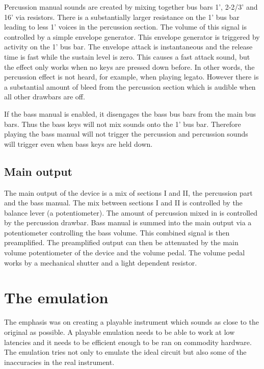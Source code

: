 \documentclass[11pt,a4paper]{article}
\begin{document}
Percussion manual sounds are created by mixing together bus bars 1', 2-2/3' and 16' via resistors. There is a substantially larger resistance on the 1' bus bar leading to less 1' voices in the percussion section. The volume of this signal is controlled by a simple envelope generator. This envelope generator is triggered by activity on the 1' bus bar. The envelope attack is instantaneous and the release time is fast while the sustain level is zero. This causes a fast attack sound, but the effect only works when no keys are pressed down before. In other words, the percussion effect is not heard, for example, when playing legato. However there is a substantial amount of bleed from the percussion section which is audible when all other drawbars are off.

If the bass manual is enabled, it disengages the bass bus bars from the main bus bars. Thus the bass keys will not mix sounds onto the 1' bus bar. Therefore playing the bass manual will not trigger the percussion and percussion sounds will trigger even when bass keys are held down.

\subsection{Main output}

The main output of the device is a mix of sections I and II, the percussion part and the bass manual. The mix between sections I and II is controlled by the balance lever (a potentiometer). The amount of percussion mixed in is controlled by the percussion drawbar. Bass manual is summed into the main output via a potentiometer controlling the bass volume. This combined signal is then preamplified. The preamplified output can then be attenuated by the main volume potentiometer of the device and the volume pedal. The volume pedal works by a mechanical shutter and a light dependent resistor.

\section{The emulation} 

The emphasis was on creating a playable instrument which sounds as close to the original as possible. A playable emulation needs to be able to work at low latencies and it needs to be efficient enough to be ran on commodity hardware. The emulation tries not only to emulate the ideal circuit but also some of the inaccuracies in the real instrument. 
\end{document}

